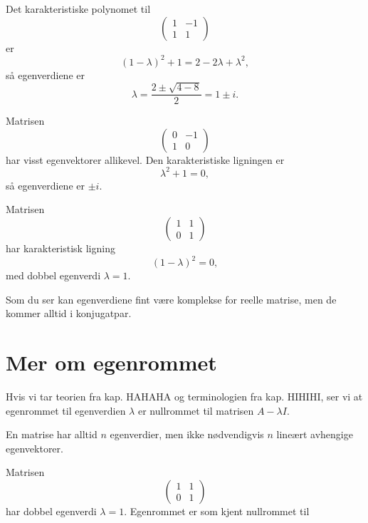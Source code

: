 \begin{ex}
Det karakteristiske polynomet til
\[
\begin{pmatrix}
1 & -1 \\ 1 &1
\end{pmatrix}
\]
er 
\[
(1-\lambda)^2+1=2-2\lambda+\lambda^2,
\]
så egenverdiene er 
\[
\lambda=\frac{2\pm\sqrt{4-8}}{2}=1\pm i.
\] 
\end{ex}

\begin{ex}
Matrisen
\[
\begin{pmatrix}
0 & -1 \\ 1 &0
\end{pmatrix}
\]
har visst egenvektorer allikevel. Den karakteristiske ligningen er 
\[
\lambda^2+1=0,
\]
så egenverdiene er $\pm i$. 
\end{ex}

\begin{ex}
Matrisen
\[
\begin{pmatrix}
1 & 1 \\ 0 &1
\end{pmatrix}
\]
har karakteristisk ligning
\[
(1-\lambda)^2=0,
\]
med dobbel egenverdi $\lambda=1$. 
\end{ex}

Som du ser kan egenverdiene fint være komplekse for reelle matrise, men de kommer alltid i konjugatpar.

\section*{Mer om egenrommet}
Hvis vi tar teorien fra kap. HAHAHA og terminologien fra kap. HIHIHI, ser vi at egenrommet til egenverdien $\lambda$ er nullrommet til matrisen $A-\lambda I$.

En matrise har alltid $n$ egenverdier, men ikke nødvendigvis $n$ lineært avhengige egenvektorer.
\begin{ex}
Matrisen
\[
\begin{pmatrix}
1 & 1 \\ 0 &1
\end{pmatrix}
\]
har dobbel egenverdi $\lambda=1$. Egenrommet er som kjent nullrommet til 
\end{ex}

\kapittelslutt
